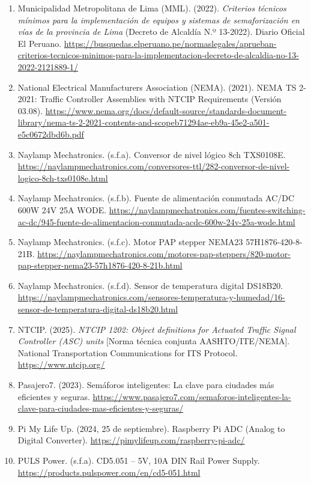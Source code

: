 \begin{enumerate}
\item
  Municipalidad Metropolitana de Lima (MML). (2022). \emph{Criterios técnicos mínimos para la implementación de equipos y sistemas de semaforización en vías de la provincia de Lima} (Decreto de Alcaldía N.º 13-2022). Diario Oficial El Peruano. \url{https://busquedas.elperuano.pe/normaslegales/aprueban-criterios-tecnicos-minimos-para-la-implementacion-decreto-de-alcaldia-no-13-2022-2121889-1/}
\item
  National Electrical Manufacturers Association (NEMA). (2021). NEMA TS 2-2021: Traffic Controller Assemblies with NTCIP Requirements (Versión 03.08). \url{https://www.nema.org/docs/default-source/standards-document-library/nema-ts-2-2021-contents-and-scopeb71294ae-eb9a-45e2-a501-e5c0672dbd6b.pdf}
\item
  Naylamp Mechatronics. (s.f.a). Conversor de nivel lógico 8ch TXS0108E. \url{https://naylampmechatronics.com/conversores-ttl/282-conversor-de-nivel-logico-8ch-txs0108e.html}
\item
  Naylamp Mechatronics. (s.f.b). Fuente de alimentación conmutada AC/DC 600W 24V 25A WODE. \url{https://naylampmechatronics.com/fuentes-switching-ac-dc/945-fuente-de-alimentacion-conmutada-acdc-600w-24v-25a-wode.html}
\item
  Naylamp Mechatronics. (s.f.c). Motor PAP stepper NEMA23 57H1876-420-8-21B. \url{https://naylampmechatronics.com/motores-pap-steppers/820-motor-pap-stepper-nema23-57h1876-420-8-21b.html}
\item
  Naylamp Mechatronics. (s.f.d). Sensor de temperatura digital DS18B20. \url{https://naylampmechatronics.com/sensores-temperatura-y-humedad/16-sensor-de-temperatura-digital-ds18b20.html}
\item
  NTCIP. (2025). \emph{NTCIP 1202: Object definitions for Actuated Traffic Signal Controller (ASC) units} [Norma técnica conjunta AASHTO/ITE/NEMA]. National Transportation Communications for ITS Protocol. \url{https://www.ntcip.org/}
\item
  Pasajero7. (2023). Semáforos inteligentes: La clave para ciudades más eficientes y seguras. \url{https://www.pasajero7.com/semaforos-inteligentes-la-clave-para-ciudades-mas-eficientes-y-seguras/}
\item
  Pi My Life Up. (2024, 25 de septiembre). Raspberry Pi ADC (Analog to Digital Converter). \url{https://pimylifeup.com/raspberry-pi-adc/}
\item
  PULS Power. (s.f.a). CD5.051 -- 5V, 10A DIN Rail Power Supply. \url{https://products.pulspower.com/en/cd5-051.html}

\end{enumerate}
